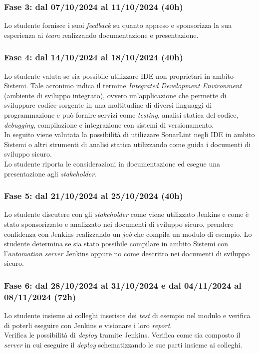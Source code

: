 \subsubsection*{Fase 3: dal 07/10/2024 al 11/10/2024 (40h) }
Lo studente fornisce i suoi \emph{feedback} su quanto appreso e sponsorizza la sua esperienza ai \emph{team} realizzando documentazione e presentazione.\\

\subsubsection*{Fase 4: dal 14/10/2024 al 18/10/2024 (40h) }
Lo studente valuta se sia possibile utilizzare IDE non proprietari in ambito \gls{Sistemi}. Tale acronimo indica il termine \emph{Integrated Development Environment} (ambiente di sviluppo integrato), ovvero un'applicazione che permette di sviluppare codice sorgente in una moltitudine di diversi linguaggi di programmazione e può fornire servizi come \emph{testing}, analisi statica del codice, \emph{debugging}, compilazione e integrazione con sistemi di versionamento.\\ 
In seguito viene valutata la possibilità di utilizzare SonarLint negli IDE in ambito \gls{Sistemi} o altri strumenti di analisi statica utilizzando come guida i documenti di sviluppo sicuro.\\
Lo studente riporta le considerazioni in documentazione ed esegue una presentazione agli \emph{stakeholder}.\\ 

\subsubsection*{Fase 5: dal 21/10/2024 al 25/10/2024 (40h) }
Lo studente discutere con gli \emph{stakeholder} come viene utilizzato Jenkins e come è stato sponsorizzato e analizzato nei documenti di sviluppo sicuro, prendere confidenza con Jenkins realizzando un \emph{job} che compila un modulo di esempio. Lo studente determina se sia stato possibile compilare in ambito \gls{Sistemi} con l'\emph{automation server} Jenkins oppure no come descritto nei documenti di sviluppo sicuro.\\

\subsubsection*{Fase 6: dal 28/10/2024 al 31/10/2024 e dal 04/11/2024 al 08/11/2024 (72h)}
Lo studente insieme ai colleghi inserisce dei \emph{test} di esempio nel modulo e verifica di poterli eseguire con Jenkins e visionare i loro \emph{report}.\\
Verifica le possibilità di \emph{deploy} tramite Jenkins. Verifica come sia composto il \emph{server} in cui eseguire il \emph{deploy} schematizzando le sue parti insieme ai colleghi.\\

